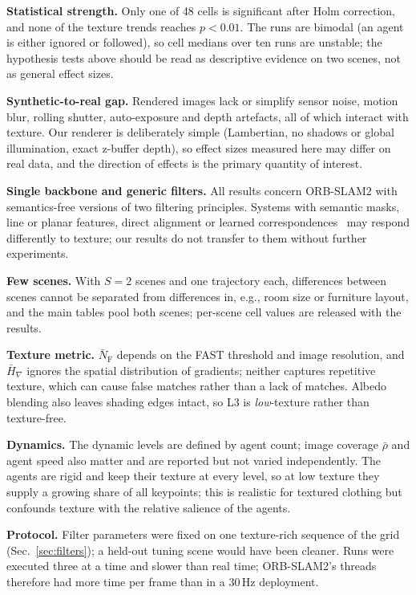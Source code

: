 \documentclass[conference]{IEEEtran}
\newcommand{\NFAST}{\bar{N}_{\mathrm{F}}}
\newcommand{\Hgrad}{\bar{H}_{\nabla}}
\begin{document}
\textbf{Statistical strength.} Only one of 48 cells is significant after Holm correction, and none of the texture trends reaches $p<0.01$. The runs are bimodal (an agent is either ignored or followed), so cell medians over ten runs are unstable; the hypothesis tests above should be read as descriptive evidence on two scenes, not as general effect sizes.

\textbf{Synthetic-to-real gap.} Rendered images lack or simplify sensor noise, motion blur, rolling shutter, auto-exposure and depth artefacts, all of which interact with texture. Our renderer is deliberately simple (Lambertian, no shadows or global illumination, exact z-buffer depth), so effect sizes measured here may differ on real data, and the direction of effects is the primary quantity of interest.

\textbf{Single backbone and generic filters.} All results concern ORB-SLAM2 with semantics-free versions of two filtering principles. Systems with semantic masks, line or planar features, direct alignment or learned correspondences~\cite{bescos2018dynaslam,yu2018dsslam,yunus2021manhattan,teed2021droid,campos2021orbslam3} may respond differently to texture; our results do not transfer to them without further experiments.

\textbf{Few scenes.} With $S=2$ scenes and one trajectory each, differences between scenes cannot be separated from differences in, e.g., room size or furniture layout, and the main tables pool both scenes; per-scene cell values are released with the results.

\textbf{Texture metric.} $\NFAST$ depends on the FAST threshold and image resolution, and $\Hgrad$ ignores the spatial distribution of gradients; neither captures repetitive texture, which can cause false matches rather than a lack of matches. Albedo blending also leaves shading edges intact, so L3 is \emph{low}-texture rather than texture-free.

\textbf{Dynamics.} The dynamic levels are defined by agent count; image coverage $\bar{\rho}$ and agent speed also matter and are reported but not varied independently. The agents are rigid and keep their texture at every level, so at low texture they supply a growing share of all keypoints; this is realistic for textured clothing but confounds texture with the relative salience of the agents.

\textbf{Protocol.} Filter parameters were fixed on one texture-rich sequence of the grid (Sec.~\ref{sec:filters}); a held-out tuning scene would have been cleaner. Runs were executed three at a time and slower than real time; ORB-SLAM2's threads therefore had more time per frame than in a 30\,Hz deployment.
\end{document}
